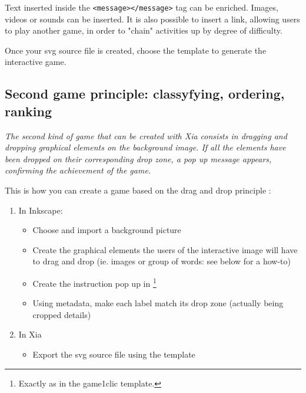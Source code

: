 \begin{tip}
Text inserted inside the \verb|<message></message>| tag can be 
enriched. Images, videos or sounds can be inserted.
It is also possible to insert a link, allowing users to play another game,
in order to "chain" activities up by degree of difficulty.
\end{tip}


Once your svg source file is created, choose the template  to generate the interactive game.

\subsection{Second game principle: classyfying, ordering, ranking}\label{gameDragAndDropsection}


\textit{The second kind of game that can be created with Xia consists in
dragging and dropping graphical elements on the background image. If all the
elements have been dropped on their corresponding drop zone, a pop up
message appears, confirming the achievement of the game.}


This is how you can create a game based on the drag and drop principle :
\begin{enumerate}
 \item In Inkscape:
\begin{itemize}
 \item Choose and import a background picture
 \item Create the graphical elements the users of the interactive image will have to drag and drop (ie. images or group of words: see below for a how-to)
 \item Create the instruction pop up in \footnote{Exactly as in the game1clic template.}
 \item Using metadata, make each label match its drop zone (actually being cropped details)
\end{itemize}
 \item In Xia
 \begin{itemize}
  \item Export the svg source file using the  template
 \end{itemize}
\end{enumerate}

